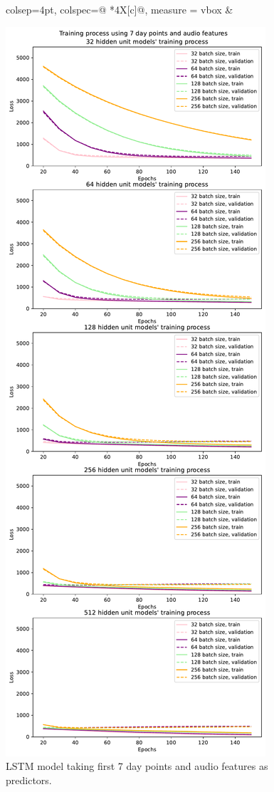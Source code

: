 \documentclass{article}
\begin{document}
\begin{figure}[H]
\begin{adjustwidth}{-1.5cm}{-1.5cm}
\begin{tblr}{colsep=4pt,
             colspec={@{} *{4}{X[c]}@{}}, 
             measure = vbox}
        &
        
            \includegraphics[width=\linewidth]{figures/hyperparameters_points_audio_training.pdf}
            \caption{LSTM model taking first 7 day points and audio features as predictors.}
            \label{fig:hyper2}
        

\end{tblr}
\end{adjustwidth}
\end{figure}
\end{document}
